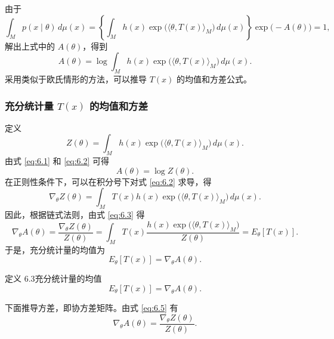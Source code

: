 由于
\[
  \int_M p(x\mid\theta)\,d\mu(x)
  =\left\{\int_M h(x)\exp\bigl(\langle\theta,T(x)\rangle_M\bigr)\,d\mu(x)\right\}
    \exp\bigl(-A(\theta)\bigr)=1,
\]
解出上式中的 $A(\theta)$，得到
\begin{equation*}
  A(\theta)=\log\int_M h(x)\exp\bigl(\langle\theta,T(x)\rangle_M\bigr)\,d\mu(x).
  \tag{6.1}\label{eq:6.1}
\end{equation*}
采用类似于欧氏情形的方法，可以推导 $T(x)$ 的均值和方差公式。

\subsubsection{充分统计量 \texorpdfstring{$T(x)$}{T(x)} 的均值和方差}

定义
\begin{equation*}
  Z(\theta)=\int_M h(x)\exp\bigl(\langle\theta,T(x)\rangle_M\bigr)\,d\mu(x).
  \tag{6.2}\label{eq:6.2}
\end{equation*}
由式 \eqref{eq:6.1} 和 \eqref{eq:6.2} 可得
\begin{equation*}
  A(\theta)=\log Z(\theta).
  \tag{6.3}\label{eq:6.3}
\end{equation*}
在正则性条件下，可以在积分号下对式 \eqref{eq:6.2} 求导，得
\begin{equation*}
  \nabla_\theta Z(\theta)=\int_M T(x)h(x)\exp\bigl(\langle\theta,T(x)\rangle_M\bigr)\,d\mu(x).
  \tag{6.4}\label{eq:6.4}
\end{equation*}
因此，根据链式法则，由式 \eqref{eq:6.3} 得
\begin{equation*}
  \nabla_\theta A(\theta)=\frac{\nabla_\theta Z(\theta)}{Z(\theta)}
  =\int_M T(x)\frac{h(x)\exp\bigl(\langle\theta,T(x)\rangle_M\bigr)}{Z(\theta)}
  =E_\theta[T(x)].
  \tag{6.5}\label{eq:6.5}
\end{equation*}
于是，充分统计量的均值为
\[
  E_\theta[T(x)]=\nabla_\theta A(\theta).
\]

\begin{statement}{定义 6.3}{充分统计量的均值}
\begin{equation*}
  E_\theta[T(x)]=\nabla_\theta A(\theta).
  \tag{6.6}\label{eq:6.6}
\end{equation*}
\end{statement}

下面推导方差，即协方差矩阵。由式 \eqref{eq:6.5} 有
\begin{equation*}
  \nabla_\theta A(\theta)=\frac{\nabla_\theta Z(\theta)}{Z(\theta)}.
  \tag{6.7}\label{eq:6.7}
\end{equation*}

